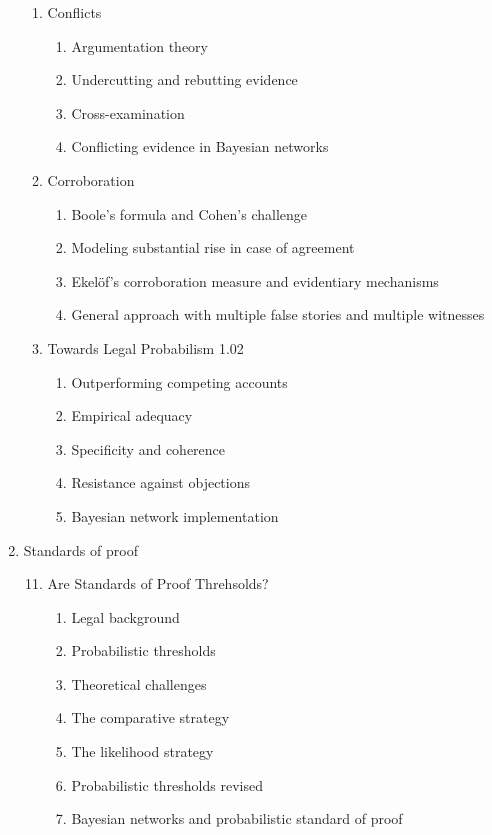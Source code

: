 \documentclass[10pt,dvipsnames,enabledeprecatedfontcommands]{scrartcl}
\begin{document}
\begin{enumerate}
\begin{enumerate}
  
  \item Conflicts
  \begin{enumerate}
  \item Argumentation theory
  \item Undercutting and rebutting evidence
  \item Cross-examination
  \item Conflicting evidence in Bayesian networks
  \end{enumerate}
 
 
  \item Corroboration
  \begin{enumerate}
  \item Boole's formula and Cohen's challenge
  \item  Modeling substantial rise in case of agreement
  \item Ekel\"of's corroboration measure and evidentiary mechanisms
  \item General approach with multiple false stories and multiple witnesses
  \end{enumerate}


  \item  Towards Legal Probabilism 1.02
    \begin{enumerate}
    \item Outperforming competing accounts
    \item Empirical adequacy
    \item Specificity and coherence
    \item Resistance against objections 
    \item Bayesian network implementation
    \end{enumerate}


\end{enumerate}
\item  Standards of proof
\begin{enumerate}


\setcounter{enumii}{10}
 \item  Are Standards of Proof Threhsolds?
  \begin{enumerate}
  \item  Legal background
  \item  Probabilistic thresholds
  \item  Theoretical challenges
  \item  The comparative strategy
  \item  The likelihood strategy
  \item  Probabilistic thresholds revised
  \item  Bayesian networks and probabilistic standard of proof
  \end{enumerate}



\end{enumerate}
\end{enumerate}
\end{document}
